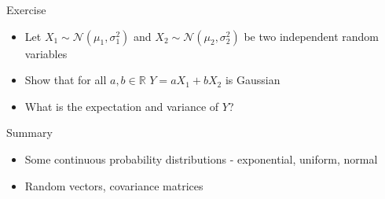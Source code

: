 \documentclass{beamer}
\begin{document}
\begin{frame}{Exercise}  
\begin{itemize} 
 \item Let $X_1 \sim \mathcal{N}(\mu_1, \sigma_1^2)$ and $X_2 \sim \mathcal{N}(\mu_2, \sigma_2^2)$ be two independent random variables 
 \item Show that for all $a, b \in \mathbb{R}$ $Y = aX_1 + bX_2$ is Gaussian
 \item What is the expectation and variance of $Y$? 
\end{itemize}
\end{frame}



\begin{frame}{Summary}  
\begin{itemize} 
 \item Some continuous probability distributions - exponential, uniform, normal 
 \item Random vectors, covariance matrices
\end{itemize}
\end{frame}
\end{document}
